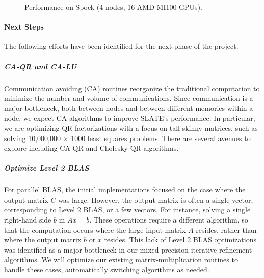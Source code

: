 \begin{figure}
    \centering
    \caption{Performance on Spock (4 nodes, 16 AMD MI100 GPUs).}
\end{figure}

\paragraph{Next Steps}
The following efforts have been identified for the next phase of the project.


\subparagraph{CA-QR and CA-LU}
Communication avoiding (CA) routines reorganize the traditional computation
to minimize the number and volume of communications.
Since communication is a major
bottleneck, both between nodes and between different memories within a node,
we expect CA algorithms to improve SLATE's performance.
In particular, we are optimizing QR factorizations with a focus on tall-skinny
matrices, such as solving 10,000,000 $\times$ 1000
least squares problems. There are several avenues to explore including
CA-QR and Cholesky-QR algorithms.

\subparagraph{Optimize Level 2 BLAS}
For parallel BLAS, the initial implementations focused on the case where
the output matrix $C$ was large. However, the output matrix is often a
single vector, corresponding to Level 2 BLAS, or a few vectors.
For instance, solving a
single right-hand side $b$ in $Ax = b$. These operations require a different
algorithm, so that the computation occurs where the large input matrix $A$
resides, rather than where the output matrix $b$ or $x$ resides. This
lack of Level 2 BLAS optimizations was identified as a major bottleneck
in our mixed-precision iterative refinement algorithms. We will optimize
our existing matrix-multiplication routines to handle these cases,
automatically switching algorithms as needed.


